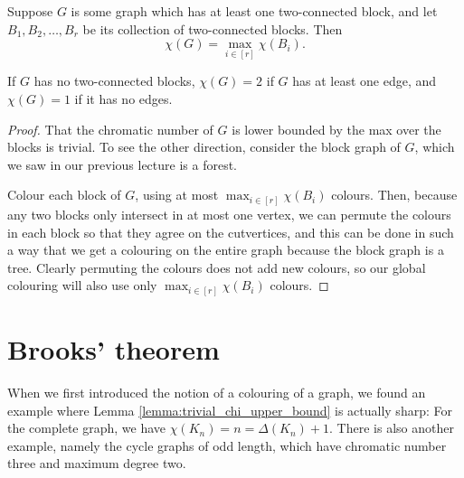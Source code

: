 \documentclass[nobib]{tufte-handout}
\begin{document}
\begin{lemma}\label{lemma:chi_max_over_biconnecteds}
  Suppose $G$ is some graph which has at least one two-connected block, and let $B_1, B_2, \ldots, B_r$ be its collection of two-connected blocks. Then
  $$\chi(G) = \max_{i\in[r]} \chi(B_i).$$

  If $G$ has no two-connected blocks, $\chi(G) = 2$ if $G$ has at least one edge, and $\chi(G) = 1$ if it has no edges.

  \begin{proof}
    That the chromatic number of $G$ is lower bounded by the max over the blocks is trivial. To see the other direction, consider the block graph of $G$, which we saw in our previous lecture is a forest.

    Colour each block of $G$, using at most $\max_{i\in[r]} \chi(B_i)$ colours. Then, because any two blocks only intersect in at most one vertex, we can permute the colours in each block so that they agree on the cutvertices, and this can be done in such a way that we get a colouring on the entire graph because the block graph is a tree. 
    Clearly permuting the colours does not add new colours, so our global colouring will also use only $\max_{i\in[r]} \chi(B_i)$ colours.
  \end{proof}
\end{lemma}


\section{Brooks' theorem}

When we first introduced the notion of a colouring of a graph, we found an example where Lemma \ref{lemma:trivial_chi_upper_bound} is actually sharp: For the complete graph, we have $\chi(K_n) = n = \Delta(K_n) + 1$. There is also another example, namely the cycle graphs of odd length, which have chromatic number three and maximum degree two.
\end{document}
